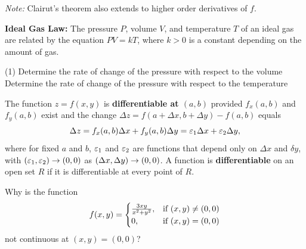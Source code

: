\documentclass[mathNotesPreamble]{subfiles}
\begin{document}
  \vspace*{0.5\baselineskip}\noindent
  \textit{Note:} Clairut's theorem also extends to higher order derivatives of $f$.

  \begin{ex*}
    \textbf{Ideal Gas Law:} The pressure $P$, volume $V$, and temperature $T$ of an ideal gas are related by the equation $PV=kT$, where $k>0$ is a constant depending on the amount of gas.
  \end{ex*}
  \begin{tasks}[after-item-skip=\stretch{1}, label=](1)
    \task Determine the rate of change of the pressure with respect to the volume
    \task Determine the rate of change of the pressure with respect to the temperature
  \end{tasks}
  \pagebreak

  \begin{defn*}[Differentiability]
    The function $z=f(x,y)$ is \textbf{differentiable at $(a,b)$} provided $f_x(a,b)$ and $f_y(a,b)$ exist and the change $\Delta z=f(a+\Delta x, b+\Delta y)-f(a,b)$ equals
      \[\Delta z=f_x(a,b)\Delta x+ f_y(a,b)\Delta y=\varepsilon_1\Delta x+\varepsilon_2\Delta y,\]
    where for fixed $a$ and $b$, $\varepsilon_1$ and $\varepsilon_2$ are functions that depend only on $\Delta x$ and $\delta y$, with ${\left(\varepsilon_1,\varepsilon_2\right)}\to (0,0)$ as ${\left(\Delta x,\Delta y\right)}\to(0,0)$. A function is \textbf{differentiable} on an open set $R$ if it is differentiable at every point of $R$.
  \end{defn*}

  \noindent

  \noindent
  \begin{ex*}
    Why is the function
      \[f(x,y)=\begin{cases}
        \frac{3xy}{x^2+y^2},& \textnormal{if } (x,y)\neq (0,0)\\
        0,& \textnormal{if } (x,y)=(0,0)
      \end{cases}\]
    not continuous at $(x,y)=(0,0)$?
  \end{ex*}
  \pagebreak
  
\end{document}
